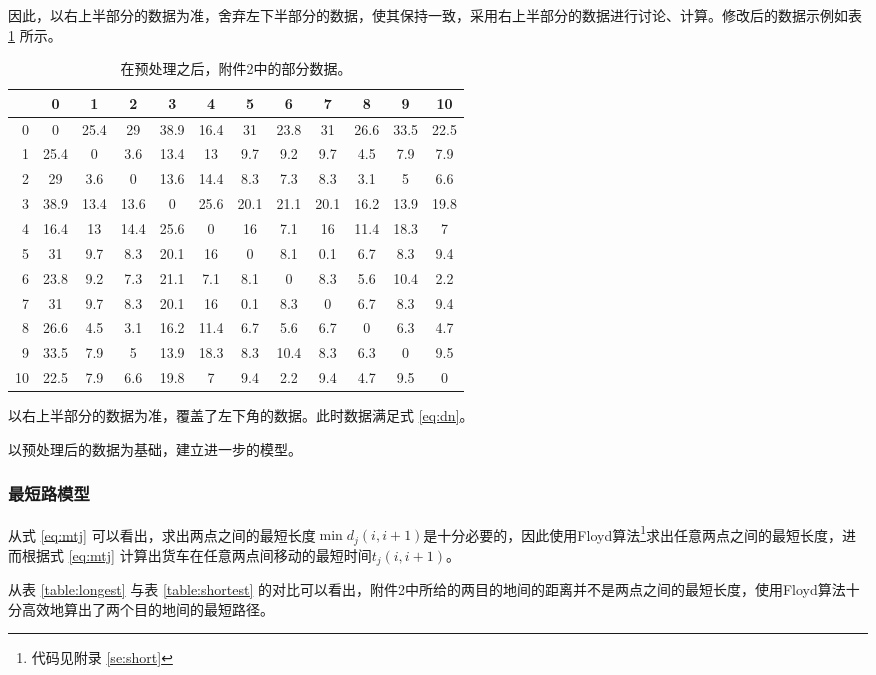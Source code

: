 \documentclass[UTF8,cs4size]{ctexart}
\begin{document}
因此，以右上半部分的数据为准，舍弃左下半部分的数据，使其保持一致，采用右上半部分的数据进行讨论、计算。修改后的数据示例如表 \ref{fig-aft} 所示。

\begin{table}[!p]
\centering
  \begin{tabular}{r|ccccccccccc}
    & 0 & 1 & 2 & 3 & 4 & 5 & 6 & 7 & 8 & 9 & 10 \\
    \hline
    0 & 0 & 25.4 & 29 & 38.9 & 16.4 & 31 & 23.8 & 31 & 26.6 & 33.5 & 22.5 \\
    1 & 25.4 & 0 & 3.6 & 13.4 & 13 & 9.7 & 9.2 & 9.7 & 4.5 & 7.9 & 7.9 \\
    2 & 29 & 3.6 & 0 & 13.6 & 14.4 & 8.3 & 7.3 & 8.3 & 3.1 & 5 & 6.6 \\
    3 & 38.9 & 13.4 & 13.6 & 0 & 25.6 & 20.1 & 21.1 & 20.1 & 16.2 & 13.9 & 19.8 \\
    4 & 16.4 & 13 & 14.4 & 25.6 & 0 & 16 & 7.1 & 16 & 11.4 & 18.3 & 7 \\
    5 & 31 & 9.7 & 8.3 & 20.1 & 16 & 0 & 8.1 & 0.1 & 6.7 & 8.3 & 9.4  \\
    6 & 23.8 & 9.2 & 7.3 & 21.1 & 7.1 & 8.1 & 0 & 8.3 & 5.6 & 10.4 & 2.2 \\
    7 & 31 & 9.7 & 8.3 & 20.1 & 16 & 0.1 & 8.3 & 0 & 6.7 & 8.3 & 9.4 \\
    8 & 26.6 & 4.5 & 3.1 & 16.2 & 11.4 & 6.7 & 5.6 & 6.7 & 0 & 6.3 & 4.7 \\
    9 & 33.5 & 7.9 & 5 & 13.9 & 18.3 & 8.3 & 10.4 & 8.3 & 6.3 & 0 & 9.5 \\
    10 & 22.5 & 7.9 & 6.6 & 19.8 & 7 & 9.4 & 2.2 & 9.4 & 4.7 & 9.5 & 0 \\
  \end{tabular}
  \caption{在预处理之后，附件2中的部分数据。}\label{fig-aft}
  以右上半部分的数据为准，覆盖了左下角的数据。此时数据满足式 \ref{eq:dn}。
\end{table}

以预处理后的数据为基础，建立进一步的模型。

\subsubsection{最短路模型}
从式 \ref{eq:mtj} 可以看出，求出两点之间的最短长度$\min d_j(i,i+1)$是十分必要的，因此使用Floyd算法\footnote{代码见附录 \ref{se:short}}求出任意两点之间的最短长度，进而根据式 \ref{eq:mtj} 计算出货车在任意两点间移动的最短时间$t_j(i,i+1)$。

从表 \ref{table:longest} 与表 \ref{table:shortest} 的对比可以看出，附件2中所给的两目的地间的距离并不是两点之间的最短长度，使用Floyd算法十分高效地算出了两个目的地间的最短路径。
\end{document}
